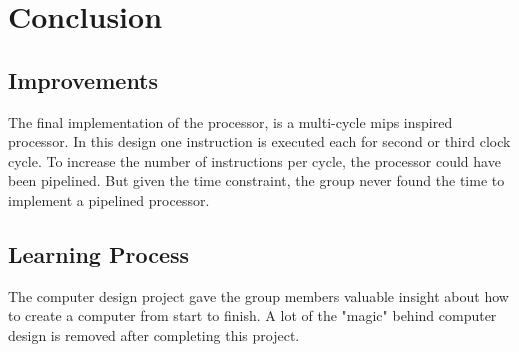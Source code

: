 \chapter{Conclusion}

\section{Improvements}
The final implementation of the processor, is a multi-cycle mips inspired processor.
In this design one instruction is executed each for second or third clock cycle.
To increase the number of instructions per cycle, the processor could have been pipelined.
But given the time constraint, the group never found the time to implement a pipelined processor.

\section{Learning Process}
The computer design project gave the group members valuable insight about how to create a computer from start to finish.
A lot of the "magic" behind computer design is removed after completing this project.
